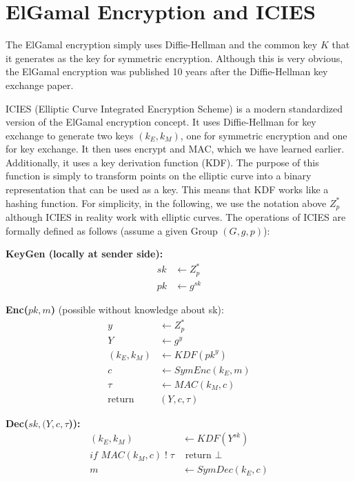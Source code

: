 \section{ElGamal Encryption and ICIES}\label{sec:elgamal}

The ElGamal encryption simply uses Diffie-Hellman and the common key $K$ that it generates as the key for symmetric encryption.
Although this is very obvious, the ElGamal encryption was published 10 years after the Diffie-Hellman key exchange paper.

ICIES (Elliptic Curve Integrated Encryption Scheme) is a modern standardized version of the ElGamal encryption concept.
It uses Diffie-Hellman for key exchange to generate two keys $(k_E, k_M)$, one for symmetric encryption and one for key exchange.
It then uses encrypt and MAC, which we have learned earlier.
Additionally, it uses a key derivation function (KDF).
The purpose of this function is simply to transform points on the elliptic curve into a binary representation that can be used as a key.
This means that KDF works like a hashing function.
For simplicity, in the following, we use the notation above $Z_p^*$ although ICIES in reality work with elliptic curves.
The operations of ICIES are formally defined as follows (assume a given Group $(G,g,p)$):

\textbf{KeyGen (locally at sender side):}
\begin{align*}
    sk & \leftarrow Z_p^*  \\
    pk & \leftarrow g^{sk}
\end{align*}

\textbf{Enc($pk, m$)} (possible without knowledge about sk):
\begin{align*}
    y              & \leftarrow Z_p^*         \\
    Y              & \leftarrow g^y           \\
    (k_E, k_M)     & \leftarrow KDF(pk^y)     \\
    c              & \leftarrow SymEnc(k_E,m) \\
    \tau           & \leftarrow MAC(k_M,c)    \\
    \text{return } & (Y,c,\tau)
\end{align*}

\textbf{Dec($sk,(Y,c,\tau$)):}
\begin{align*}
    (k_E,k_M)                           & \leftarrow KDF(Y^{sk})   \\
    \textit{if } MAC(k_M, c) \;!\; \tau & \text{ return } \perp    \\
    m                                   & \leftarrow SymDec(k_E,c)
\end{align*}

